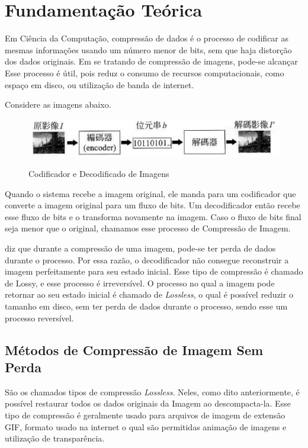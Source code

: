 \chapter{Fundamentação Teórica}
\label{c.fundamentacaoteorica}

Em Ciência da Computação, compressão de dados é o processo de codificar as mesmas informações usando um número menor de bits, sem que haja distorção dos dados originais. Em se tratando de compressão de imagens, pode-se alcançar Esse processo é útil, pois reduz o consumo de recursos computacionais, como espaço em disco, ou utilização de banda de internet.

Considere as imagens abaixo.

\begin{figure}[h]
\caption{\small Codificador e Decodificado de Imagens}
\centering
\includegraphics[scale=0.50]{figs/image_compression.jpg}
\label{f.imagecompressionbasics}
\end{figure}

Quando o sistema recebe a imagem original, ele manda para um codificador que converte a imagem original para um fluxo de bits. Um decodificador então recebe esse fluxo de bits e o transforma novamente na imagem. Caso o fluxo de bits final seja menor que o original, chamamos esse processo de Compressão de Imagem.

\citeauthor{mackenzielossless} diz que durante a compressão de uma imagem, pode-se ter perda de dados durante o processo. Por essa razão, o decodificador não consegue reconstruir a imagem perfeitamente para seu estado inicial. Esse tipo de compressão é chamado de Lossy, e esse processo é irreversível. O processo no qual a imagem pode retornar ao seu estado inicial é chamado de {\em Lossless}, o qual é possível reduzir o tamanho em disco, sem ter perda de dados durante o processo, sendo esse um processo reversível.

\section{Métodos de Compressão de Imagem Sem Perda}
\label{s.lossless}

São os chamados tipos de compressão {\em Lossless}. Neles, como dito anteriormente, é possível restaurar todos os dados originais da Imagem ao descompacta-la. Esse tipo de compressão é geralmente usado para arquivos de imagem de extensão GIF, formato usado na internet o qual são permitidas animação de imagens e utilização de transparência.

